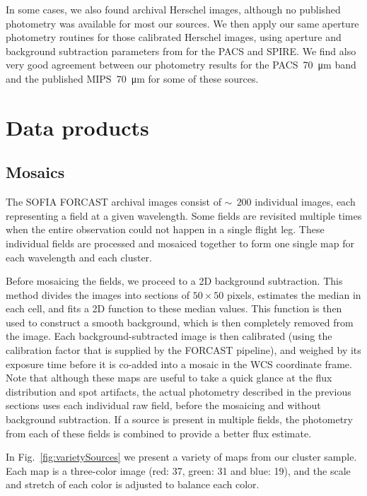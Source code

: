In some cases, we also found archival Herschel images, although no published photometry was available for most our sources. We then apply our same aperture photometry routines for those calibrated Herschel images, using aperture and background subtraction parameters from \citep{Shimizu:2016if} for the PACS and SPIRE. We find also very good agreement between our photometry results for the PACS~\SI{70}{\um} band and the published \Spitzer MIPS~\SI{70}{\um} for some of these sources. %

\section{Data products}

\subsection{Mosaics}
The SOFIA FORCAST archival images consist of $\sim~\ 200$ individual images, each representing a field at a given wavelength. Some fields are revisited multiple times when the entire observation could not happen in a single flight leg. These individual fields are processed and mosaiced together to form one single map for each wavelength and each cluster. 

Before mosaicing the fields, we proceed to a 2D background subtraction. This method divides the images into sections of $50\times 50$ pixels, estimates the median in each cell, and fits a 2D function to these median values. This function is then used to construct a smooth background, which is then completely removed from the image. Each background-subtracted image is then calibrated (using the calibration factor that is supplied by the FORCAST pipeline), and weighed by its exposure time before it is co-added into a mosaic in the WCS coordinate frame. Note that although these maps are useful to take a quick glance at the flux distribution and spot artifacts, the actual photometry described in the previous sections uses each individual raw field, before the mosaicing and without background subtraction. If a source is present in multiple fields, the photometry from each of these fields is combined to provide a better flux estimate.

In Fig.~\ref{fig:varietySources} we present a variety of maps from our cluster sample. Each map is a three-color image (red: \SI{37}{\micron}, green: \SI{31}{\micron} and blue: \SI{19}{\micron}), and the scale and stretch of each color is adjusted to balance each color. 

